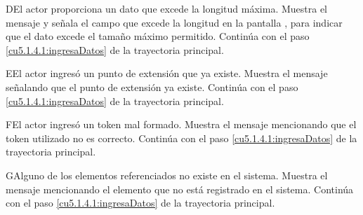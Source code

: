  \begin{UCtrayectoriaA}{D}{El actor proporciona un dato que excede la longitud máxima.}
    \UCpaso[\UCsist] Muestra el mensaje  y señala el campo que excede la 
    longitud en la pantalla , para indicar que el dato excede el tamaño máximo permitido.
    \UCpaso[] Continúa con el paso \ref{cu5.1.4.1:ingresaDatos} de la trayectoria principal.
 \end{UCtrayectoriaA}
 \begin{UCtrayectoriaA}{E}{El actor ingresó un punto de extensión que ya existe.}
    \UCpaso[\UCsist] Muestra el mensaje  señalando que el punto de extensión ya existe.
    \UCpaso[] Continúa con el paso \ref{cu5.1.4.1:ingresaDatos} de la trayectoria principal.
 \end{UCtrayectoriaA}
 \begin{UCtrayectoriaA}{F}{El actor ingresó un token mal formado.}
    \UCpaso[\UCsist] Muestra el mensaje  mencionando que el token utilizado no es correcto.
    \UCpaso[] Continúa con el paso \ref{cu5.1.4.1:ingresaDatos} de la trayectoria principal.
 \end{UCtrayectoriaA}
 \begin{UCtrayectoriaA}{G}{Alguno de los elementos referenciados no existe en el sistema.}
    \UCpaso[\UCsist] Muestra el mensaje  mencionando el elemento que no está registrado en el sistema.
    \UCpaso[] Continúa con el paso \ref{cu5.1.4.1:ingresaDatos} de la trayectoria principal.
 \end{UCtrayectoriaA}
  